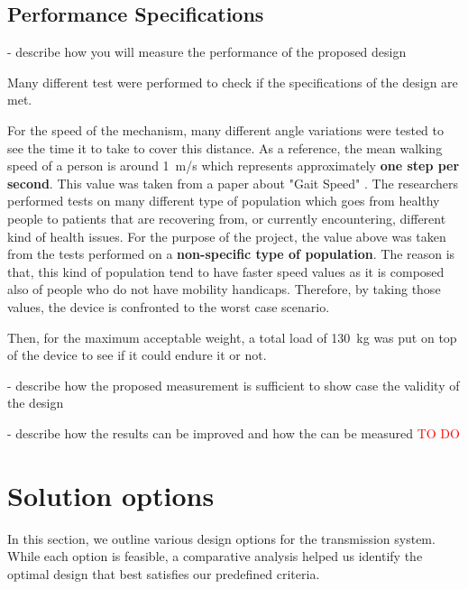 \documentclass[lettersize,journal]{IEEEtran}
\begin{document}
\subsection{Performance Specifications}

- describe how you will measure the performance of the proposed design

Many different test were performed to check if the specifications of the design are met. 


For the speed of the mechanism, many different angle variations were tested to see the time it to take to cover this distance. As a reference, the mean walking speed of a person is around \SI{1}{m/s} which represents approximately \textbf{one step per second}. This value was taken from a paper about "Gait Speed" \cite{step}. The researchers performed tests on many different type of population which goes from healthy people to patients that are recovering from, or currently encountering, different kind of health issues. For the purpose of the project, the value above was taken from the tests performed on a \textbf{non-specific type of population}. The reason is that, this kind of population tend to have faster speed values as it is composed also of people who do not have mobility handicaps. Therefore, by taking those values, the device is confronted to the worst case scenario.


Then, for the maximum acceptable weight, a total load of \SI{130}{kg} was put on top of the device to see if it could endure it or not.




- describe how the proposed measurement is sufficient to show case the validity of the design

- describe how the results can be improved and how the can be measured
\textcolor{red}{TO DO}


\section{Solution options}


In this section, we outline various design options for the transmission system. While each option is feasible, a comparative analysis helped us identify the optimal design that best satisfies our predefined criteria.
\end{document}

